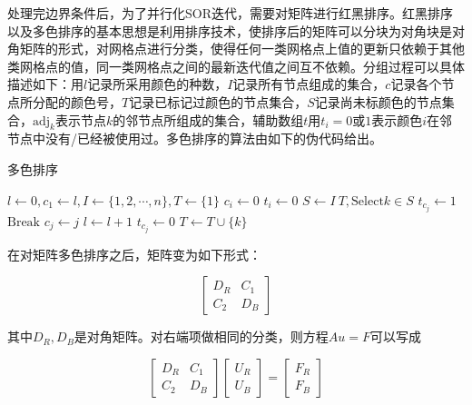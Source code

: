 \documentclass{article}
\begin{document}
处理完边界条件后，为了并行化SOR迭代，需要对矩阵进行红黑排序。红黑排序以及多色排序的基本思想是利用排序技术，使排序后的矩阵可以分块为对角块是对角矩阵的形式，对网格点进行分类，使得任何一类网格点上值的更新只依赖于其他类网格点的值，同一类网格点之间的最新迭代值之间互不依赖。分组过程可以具体描述如下：用$l$记录所采用颜色的种数，$I$记录所有节点组成的集合，$c$记录各个节点所分配的颜色号，$T$记录已标记过颜色的节点集合，$S$记录尚未标颜色的节点集合，$\textrm{adj}_{k}$表示节点$k$的邻节点所组成的集合，辅助数组$t$用$t_{i}=0$或$1$表示颜色$i$在邻节点中没有/已经被使用过。多色排序的算法由如下的伪代码给出。

\begin{CJK*}{UTF8}{gkai}
	\begin{algorithm}
		\caption{多色排序}
		\begin{algorithmic}[1] %
			\State $l \gets 0,c_{1}\gets l,I \gets \{1,2,\cdots,n\},T\gets \{1\}$
			 $c_{i}\gets 0$
			\EndFor
			 $t_{i}\gets 0$
			\EndFor
				\State $S\gets I\ T,\textrm{Select} k\in S$
				  $t_{c_{j}}\gets 1$
				\EndFor
					 $\textrm{Break}$ 
					\EndIf
				\EndFor
				\State $c_{j}\gets j$
				 $l\gets l+1$
				\EndIf
				 $t_{c_{j}}\gets 0$
				\EndFor
				\State $T \gets T\cup \{k\}$
			\EndWhile
		\end{algorithmic}
	\end{algorithm}
\end{CJK*}

在对矩阵多色排序之后，矩阵变为如下形式：

$$\left[\begin{matrix}
D_{R} & C_{1}\\
C_{2} & D_{B}
\end{matrix}\right]$$

其中$D_{R},D_{B}$是对角矩阵。对右端项做相同的分类，则方程$Au=F$可以写成

$$\left[\begin{matrix}
D_{R} & C_{1}\\
C_{2} & D_{B}
\end{matrix}\right]
\left[\begin{matrix}
U_{R}\\
U_{B}
\end{matrix}\right]=
\left[\begin{matrix}
F_{R}\\
F_{B}
\end{matrix}\right]$$
\end{document}
